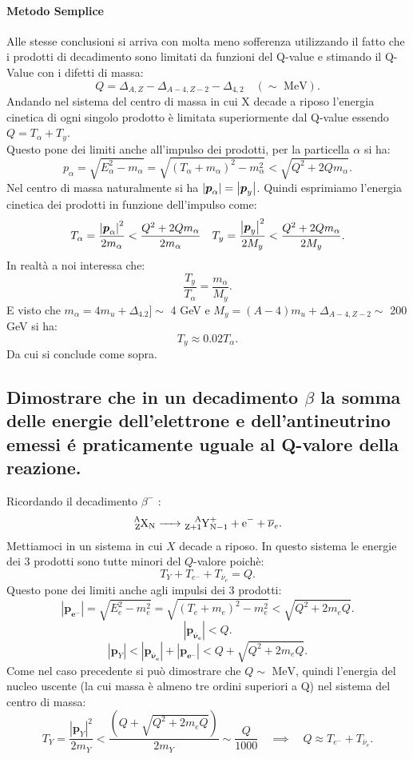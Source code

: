 \paragraph{Metodo Semplice}%
Alle stesse conclusioni si arriva con molta meno sofferenza utilizzando il fatto che i prodotti di decadimento sono limitati da funzioni del Q-value e stimando il Q-Value con i difetti di massa:
\[
	Q = \Delta_{A,Z} - \Delta_{A-4,Z-2} -\Delta_{4,2} \quad \left( \sim \text{ MeV} \right) 
.\]
Andando nel sistema del centro di massa in cui X decade a riposo l'energia cinetica di ogni singolo prodotto è limitata superiormente dal Q-value essendo $Q = T_{\alpha}+ T_{y}$.\\
Questo pone dei limiti anche all'impulso dei prodotti, per la particella $\alpha$ si ha:
\[
	p_{\alpha}= \sqrt{E_{\alpha}^2-m_{\alpha}}= \sqrt{\left( T_{\alpha}+m_{\alpha}\right)^2- m_{\alpha}^2 } < \sqrt{Q^2+2Qm_{\alpha}} 
.\] 
Nel centro di massa naturalmente si ha $\left| \boldsymbol{p}_{\alpha} \right| = \left| \boldsymbol{p}_{y} \right| $. Quindi esprimiamo l'energia cinetica dei prodotti in  funzione dell'impulso come:
\begin{align*}
	&T_{\alpha} = \frac{\left| \boldsymbol{p}_{\alpha} \right|^2 }{2m_{\alpha}}< \frac{Q^2+2Qm_{\alpha}}{2m_{\alpha}} 
	&T_{y} =  \frac{\left| \boldsymbol{p}_{y} \right|^2 }{2M_{y}}< \frac{Q^2+2Qm_{\alpha}}{2M_{y}} 
.\end{align*}
In realtà a noi interessa che:
\[
	\frac{T_{y}}{T_{\alpha}}= \frac{m_{\alpha}}{M_{y}}
.\] 
E visto che $m_{\alpha} = 4 m_{u} + \Delta_{4.2} ]\sim$ 4 GeV e $M_{y}=\left(A-4\right)m_{u}+ \Delta_{A-4, Z-2}\sim$ 200 GeV si ha:
\[
	T_{y} \approx 0.02 T_{\alpha}
.\] 
Da cui si conclude come sopra.


\subsection[]{ Dimostrare che in un decadimento $\beta$ la somma delle energie dell'elettrone e dell'antineutrino emessi é praticamente uguale al Q-valore della reazione.}
Ricordando il decadimento $\beta^-$ :
\[
\ce{\ce{^{A}_{Z}X_{N}} -> \ce{^{A}_{Z+1}Y^+_{N-1}} + e^- + \overline{\nu}_e}
.\]
Mettiamoci in un sistema in cui $X$ decade a riposo. In questo sistema le energie dei 3 prodotti sono tutte minori del $Q$-valore poichè:
\[
T_Y + T_{e^-} + T_{\overline{\nu}_e} = Q
.\] 
Questo pone dei limiti anche agli impulsi dei 3 prodotti:
\[
	\left| \boldsymbol{p_{e^-}} \right| = \sqrt{E_e^2 - m_e^2}  = \sqrt{\left( T_e + m_e \right)^2 - m_e^2 } < \sqrt{Q^2+2m_eQ}  
.\] 
\[
	\left| \boldsymbol{p_{\overline{\nu}_e}} \right| < Q 
.\]
\[
\left| \boldsymbol{p}_Y \right| <  \left| \boldsymbol{p_{\overline{\nu}_e}} \right| + \left| \boldsymbol{p_{e^-}} \right| < Q + \sqrt{Q^2+2m_eQ} 
.\] 
Come nel caso precedente si può dimostrare che $Q \sim \text{ MeV}$, quindi l'energia del nucleo uscente (la cui massa è almeno tre ordini superiori a Q) nel sistema del centro di massa:
\[
	T_{Y} = \frac{\left| \boldsymbol{p}_Y \right|^2 }{2m_Y} < \frac{\left( Q + \sqrt{Q^2+2m_e Q}  \right) }{2m_Y}  \sim \frac{Q}{1000} \quad \implies
	\quad Q \approx T_{e^-} + T_{\overline{\nu}_e} 
.\] 
